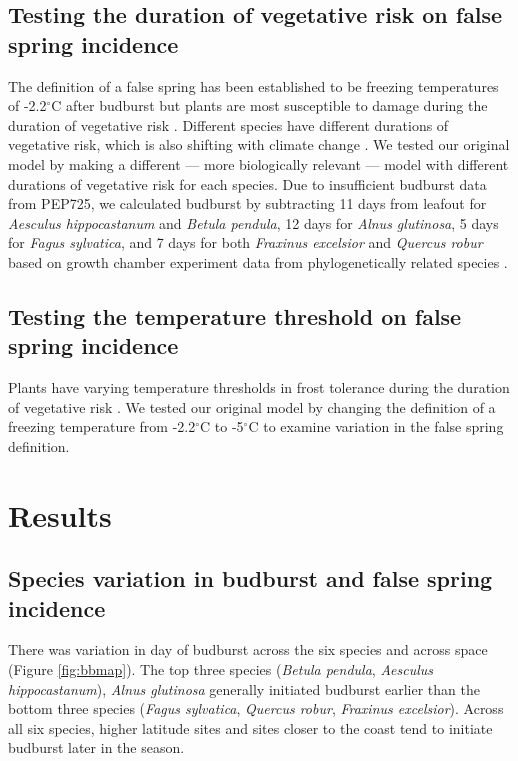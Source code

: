 \documentclass{article}\usepackage[]{graphicx}\usepackage[]{color}
\begin{document}
\subsection*{Testing the duration of vegetative risk on false spring incidence}
The definition of a false spring has been established to be freezing temperatures of -2.2$^{\circ}$C \citep{Schwartz1993} after budburst but plants are most susceptible to damage during the duration of vegetative risk \citep{Augspurger2013, Lenz2016}. Different species have different durations of vegetative risk, which is also shifting with climate change \citep{Cleland2006, Fu2015, Xin2016}. We tested our original model by making a different --- more biologically relevant --- model with different durations of vegetative risk for each species. Due to insufficient budburst data from PEP725, we calculated budburst by subtracting 11 days from leafout for \textit{Aesculus hippocastanum} and \textit{Betula pendula}, 12 days for \textit{Alnus glutinosa}, 5 days for \textit{Fagus sylvatica}, and 7 days for both \textit{Fraxinus excelsior} and \textit{Quercus robur} based on growth chamber experiment data from phylogenetically related species \citep{Buerki2010, Wang2016, Hipp2017, Flynn2018}.

\subsection*{Testing the temperature threshold on false spring incidence}
Plants have varying temperature thresholds in frost tolerance during the duration of vegetative risk \citep{Lenz2013}. We tested our original model by changing the definition of a freezing temperature from -2.2$^{\circ}$C \citep{Schwartz1993} to -5$^{\circ}$C \citep{Lenz2013, Sakai1987} to examine variation in the false spring definition.

\section*{Results}
\subsection*{Species variation in budburst and false spring incidence}
There was variation in day of budburst across the six species and across space (Figure \ref{fig:bbmap}). The top three species (\textit{Betula pendula}, \textit{Aesculus hippocastanum}), \textit{Alnus glutinosa} generally initiated budburst earlier than the bottom three species (\textit{Fagus sylvatica}, \textit{Quercus robur}, \textit{Fraxinus excelsior}). Across all six species, higher latitude sites and sites closer to the coast tend to initiate budburst later in the season. 
\end{document}

